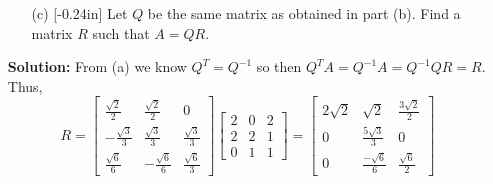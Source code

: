 \documentclass[letterpaper,12pt]{article}
\theoremstyle{definition}
\begin{document}
\begin{enumerate}
    \item[] \begin{enumerate}
        \item[(c)]\reversemarginpar{}[-0.24in] Let $Q$ be the same matrix as obtained in part (b). Find a matrix $R$ such that $A = QR$.
    \end{enumerate}
    \begin{mdframed}
        \textbf{Solution:} From (a) we know $Q^T = Q^{-1}$ so then $Q^{T}A = Q^{-1}A = Q^{-1}QR = R$. Thus,
        $$R = \begin{bmatrix}
            \frac{\sqrt{2}}{2} &\frac{\sqrt{2}}{2} & 0\\
            -\frac{\sqrt{3}}{3} & \frac{\sqrt{3}}{3} & \frac{\sqrt{3}}{3} \\
            \frac{\sqrt{6}}{6}  & -\frac{\sqrt{6}}{6} & \frac{\sqrt{6}}{3}
        \end{bmatrix}\begin{bmatrix}
     2 & 0 & 2 \\ 2 & 2 & 1 \\ 0& 1 & 1
 \end{bmatrix} = \begin{bmatrix}
     2\sqrt{2} & \sqrt{2} & \frac{3\sqrt{2}}{2} \\
     0 & \frac{5\sqrt{3}}{3} & 0 \\
     0 & \frac{-\sqrt{6}}{6} & \frac{\sqrt{6}}{2}
 \end{bmatrix}$$
    \end{mdframed}
\end{enumerate}
\end{document}
